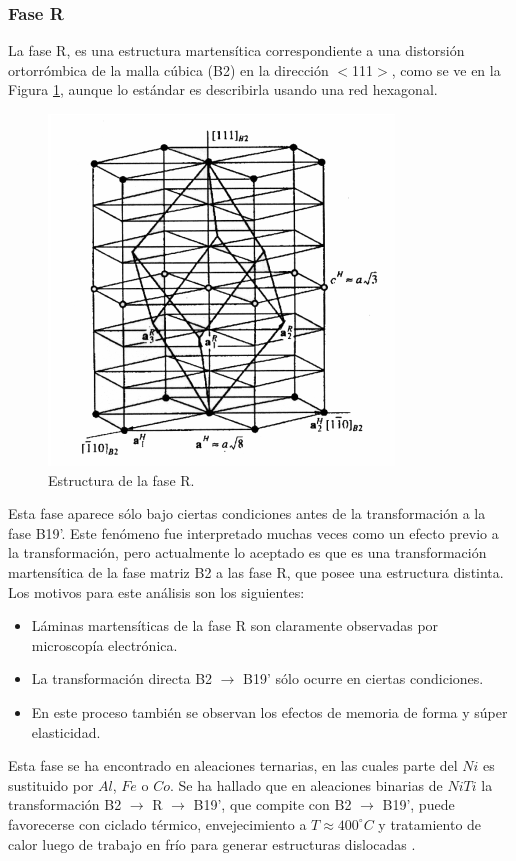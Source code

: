 \documentclass[12pt]{article}
\theoremstyle{definition}
\theoremstyle{remark}
\begin{document}
\subsubsection{Fase R}
La fase R, es una estructura martensítica correspondiente a una distorsión
ortorrómbica de la malla cúbica (B2) en la dirección $<$111$>$, como se ve en la Figura \ref{RPhase}, aunque lo estándar es describirla usando una red hexagonal.
\begin{figure}[H]
	\centering	
	\includegraphics[scale=0.5]{img/RPhase.png}
	\caption{Estructura de la fase R.}
	\label{RPhase}
\end{figure}

Esta fase aparece sólo bajo ciertas condiciones antes de la transformación a la fase B19'. Este fenómeno fue interpretado muchas veces como un efecto previo a la transformación, pero actualmente lo aceptado es que es una transformación martensítica de la fase matriz B2 a las fase R, que posee una estructura distinta. Los motivos para este análisis son los siguientes:
\begin{itemize}
	\item Láminas martensíticas de la fase R son claramente observadas por microscopía electrónica.
	\item La transformación directa B2 $\rightarrow$ B19' sólo ocurre en ciertas condiciones.
	\item En este proceso también se observan los efectos de memoria de forma y súper elasticidad.
\end{itemize}


Esta fase se ha encontrado en aleaciones ternarias, en las cuales parte del $Ni$ es sustituido por $Al$, $Fe$ o $Co$. Se ha hallado que en  aleaciones binarias de $NiTi$ la transformación B2 $\rightarrow$ R $\rightarrow$ B19', que compite con B2 $\rightarrow$ B19', puede favorecerse con ciclado térmico, envejecimiento a $T \approx 400 ^\circ C$ y tratamiento de calor luego de trabajo en frío para generar estructuras dislocadas \cite{Santamarta}\cite{ThinFilm}\cite{TiNi}. 
\end{document}
